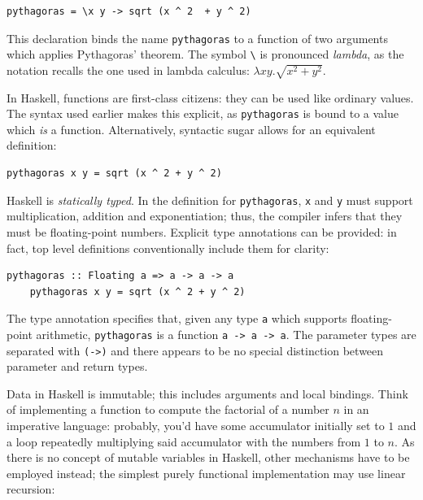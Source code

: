 \documentclass[UdineBachThesis,american,11pt]{PhdThesis}
\begin{document}
  \begin{Verbatim}[gobble=4,fontsize=\small]
    pythagoras = \x y -> sqrt (x ^ 2  + y ^ 2)
  \end{Verbatim}

  \pagebreak

  This declaration binds the name \mbox{\texttt{pythagoras}} to a function of
  two arguments which applies Pythagoras' theorem. The symbol
  \texttt{\textbackslash} is pronounced \emph{lambda}, as the notation recalls
  the one used in lambda calculus: \mbox{$\lambda x y . \sqrt{x^2 + y^2}$}.

  In Haskell, functions are first-class citizens: they can be used like ordinary
  values. The syntax used earlier makes this explicit, as
  \mbox{\texttt{pythagoras}} is bound to a value which \emph{is} a function.
  Alternatively, syntactic sugar allows for an equivalent definition:

  \begin{Verbatim}[gobble=4,fontsize=\small]
    pythagoras x y = sqrt (x ^ 2 + y ^ 2)
  \end{Verbatim}

  Haskell is \emph{statically typed}. In the definition for
  \mbox{\texttt{pythagoras}}, \texttt{x} and \texttt{y} must support
  multiplication, addition and exponentiation; thus, the compiler infers that
  they must be floating-point numbers. Explicit type annotations can be
  provided: in fact, top level definitions conventionally include them for
  clarity:

  \begin{Verbatim}[gobble=4,fontsize=\small]
    pythagoras :: Floating a => a -> a -> a
    pythagoras x y = sqrt (x ^ 2 + y ^ 2)
  \end{Verbatim}

  The type annotation specifies that, given any type \texttt{a} which supports
  floating-point arithmetic, \mbox{\texttt{pythagoras}} is a function
  \mbox{\texttt{a -> a -> a}}. The parameter types are separated with
  \mbox{\texttt{(->)}} and there appears to be no special distinction between
  parameter and return types.

  Data in Haskell is immutable; this includes arguments and local bindings.
  Think of implementing a function to compute the factorial of a number $n$ in
  an imperative language: probably, you'd have some accumulator initially set to
  $1$ and a loop repeatedly multiplying said accumulator with the numbers from
  $1$ to $n$. As there is no concept of mutable variables in Haskell, other
  mechanisms have to be employed instead; the simplest purely functional
  implementation may use linear recursion:
\end{document}
